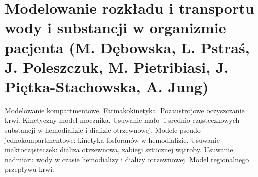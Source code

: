 \chapter{Modelowanie rozkładu i transportu wody i substancji w organizmie pacjenta (M. Dębowska, L. Pstraś, J. Poleszczuk, M. Pietribiasi, J. Piętka-Stachowska, A. Jung)}

Modelowanie kompartmentowe. Farmakokinetyka. Pozaustrojowe oczyszczanie krwi. Kinetyczny model mocznika. Usuwanie mało- i średnio-cząsteczkowych substancji w hemodializie i dializie otrzewnowej. Modele pseudo-jednokompartmentowe: kinetyka fosforanów w hemodializie. Usuwanie makrocząsteczek: dializa otrzewnowa, zabiegi sztucznej wątroby. Usuwanie nadmiaru wody w czasie hemodializy i dializy otrzewnowej. Model regionalnego przepływu krwi. 
